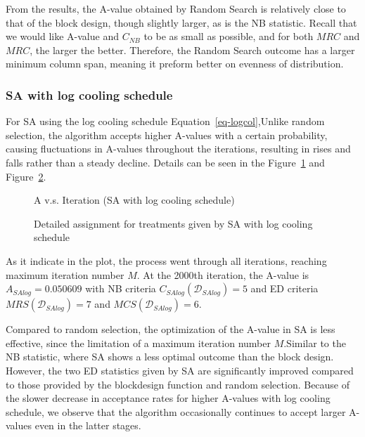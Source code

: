 \documentclass[
  a4paper,
  oneside,
  openany,
  12pt,
  onecolumn]{book}
\theoremstyle{definition}
\theoremstyle{definition}
\theoremstyle{plain}
\theoremstyle{remark}
\begin{document}
From the results, the A-value obtained by Random Search is relatively
close to that of the block design, though slightly larger, as is the NB
statistic. Recall that we would like A-value and \(C_{NB}\) to be as
small as possible, and for both \(MRC\) and \(MRC\), the larger the
better. Therefore, the Random Search outcome has a larger minimum column
span, meaning it preform better on evenness of distribution.

\subsubsection{SA with log cooling
schedule}\label{sa-with-log-cooling-schedule}

For SA using the log cooling schedule Equation~\ref{eq-logcol},Unlike
random selection, the algorithm accepts higher A-values with a certain
probability, causing fluctuations in A-values throughout the iterations,
resulting in rises and falls rather than a steady decline. Details can
be seen in the Figure~\ref{fig-AvISAlog} and Figure~\ref{fig-SAlog}.

\begin{figure}


\caption{\label{fig-AvISAlog}A v.s. Iteration (SA with log cooling
schedule)}

\end{figure}%

\begin{figure}


\caption{\label{fig-SAlog}Detailed assignment for treatments given by SA
with log cooling schedule}

\end{figure}%

As it indicate in the plot, the process went through all iterations,
reaching maximum iteration number \(M\). At the 2000th iteration, the
A-value is \(A_{SAlog}=0.050609\) with NB criteria
\(C_{SAlog}(\mathcal{D}_{SAlog})=5\) and ED criteria
\(MRS(\mathcal{D}_{SAlog})=7\) and \(MCS(\mathcal{D}_{SAlog})=6\).

Compared to random selection, the optimization of the A-value in SA is
less effective, since the limitation of a maximum iteration number
\(M\).Similar to the NB statistic, where SA shows a less optimal outcome
than the block design. However, the two ED statistics given by SA are
significantly improved compared to those provided by the blockdesign
function and random selection. Because of the slower decrease in
acceptance rates for higher A-values with log cooling schedule, we
observe that the algorithm occasionally continues to accept larger
A-values even in the latter stages.
\end{document}
